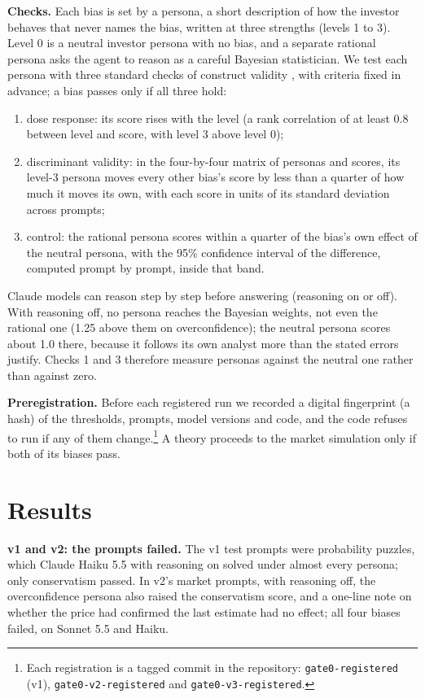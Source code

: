 \documentclass[10pt]{article}
\begin{document}
\textbf{Checks.} Each bias is set by a persona, a short description of how the investor behaves that never names the bias, written at three strengths (levels 1 to 3). Level 0 is a neutral investor persona with no bias, and a separate rational persona asks the agent to reason as a careful Bayesian statistician. We test each persona with three standard checks of construct validity \citep{cronbach1955construct,campbell1959convergent}, with criteria fixed in advance; a bias passes only if all three hold:
\begin{enumerate}\setlength{\itemsep}{0pt}
\item dose response: its score rises with the level (a rank correlation of at least 0.8 between level and score, with level 3 above level 0);
\item discriminant validity: in the four-by-four matrix of personas and scores, its level-3 persona moves every other bias's score by less than a quarter of how much it moves its own, with each score in units of its standard deviation across prompts;
\item control: the rational persona scores within a quarter of the bias's own effect of the neutral persona, with the 95\% confidence interval of the difference, computed prompt by prompt, inside that band.
\end{enumerate}
Claude models can reason step by step before answering (reasoning on or off). With reasoning off, no persona reaches the Bayesian weights, not even the rational one (1.25 above them on overconfidence); the neutral persona scores about 1.0 there, because it follows its own analyst more than the stated errors justify. Checks 1 and 3 therefore measure personas against the neutral one rather than against zero.

\textbf{Preregistration.} Before each registered run we recorded a digital fingerprint (a hash) of the thresholds, prompts, model versions and code, and the code refuses to run if any of them change.\footnote{Each registration is a tagged commit in the repository: \texttt{gate0-registered} (v1), \texttt{gate0-v2-registered} and \texttt{gate0-v3-registered}.} A theory proceeds to the market simulation only if both of its biases pass.

\section{Results}

\textbf{v1 and v2: the prompts failed.} The v1 test prompts were probability puzzles, which Claude Haiku 5.5 with reasoning on solved under almost every persona; only conservatism passed. In v2's market prompts, with reasoning off, the overconfidence persona also raised the conservatism score, and a one-line note on whether the price had confirmed the last estimate had no effect; all four biases failed, on Sonnet 5.5 and Haiku.
\end{document}
